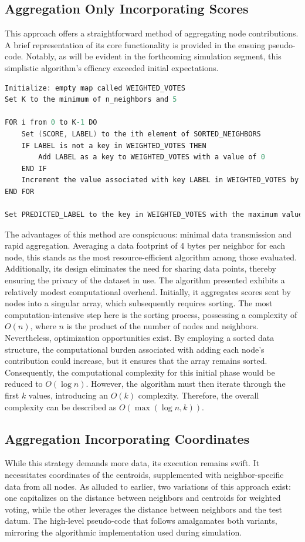 \subsection{Aggregation Only Incorporating Scores}
This approach offers a straightforward method of aggregating node contributions. A brief representation of its core functionality is provided in the ensuing pseudo-code. Notably, as will be evident in the forthcoming simulation segment, this simplistic algorithm's efficacy exceeded initial expectations.

\newpage

\begin{lstlisting}[language=C]
Initialize: empty map called WEIGHTED_VOTES
Set K to the minimum of n_neighbors and 5

FOR i from 0 to K-1 DO
    Set (SCORE, LABEL) to the ith element of SORTED_NEIGHBORS
    IF LABEL is not a key in WEIGHTED_VOTES THEN
        Add LABEL as a key to WEIGHTED_VOTES with a value of 0
    END IF
    Increment the value associated with key LABEL in WEIGHTED_VOTES by SCORE
END FOR

Set PREDICTED_LABEL to the key in WEIGHTED_VOTES with the maximum value
\end{lstlisting}

The advantages of this method are conspicuous: minimal data transmission and rapid aggregation. Averaging a data footprint of 4 bytes per neighbor for each node, this stands as the most resource-efficient algorithm among those evaluated. Additionally, its design eliminates the need for sharing data points, thereby ensuring the privacy of the dataset in use.
The algorithm presented exhibits a relatively modest computational overhead. Initially, it aggregates scores sent by nodes into a singular array, which subsequently requires sorting. The most computation-intensive step here is the sorting process, possessing a complexity of \(O(n)\), where \(n\) is the product of the number of nodes and neighbors. Nevertheless, optimization opportunities exist. By employing a sorted data structure, the computational burden associated with adding each node's contribution could increase, but it ensures that the array remains sorted. Consequently, the computational complexity for this initial phase would be reduced to \(O(\log n)\). However, the algorithm must then iterate through the first \(k\) values, introducing an \(O(k)\) complexity. Therefore, the overall complexity can be described as \(O(\max(\log n, k))\).


\subsection{Aggregation Incorporating Coordinates}
While this strategy demands more data, its execution remains swift. It necessitates coordinates of the centroids, supplemented with neighbor-specific data from all nodes. As alluded to earlier, two variations of this approach exist: one capitalizes on the distance between neighbors and centroids for weighted voting, while the other leverages the distance between neighbors and the test datum. The high-level pseudo-code that follows amalgamates both variants, mirroring the algorithmic implementation used during simulation.  



